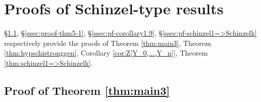 \documentclass[11pt,a4paper,reqno]{amsart}
\theoremstyle{definition}
\begin{document}
\section{Proofs of Schinzel-type results} \label{sec:proofs}

\S \ref{ssec:Schinzel-H}, \S \ref{ssec:proof-thm5-1}, \S \ref{ssec:pf-corollary1.9}, \S \ref{ssec:pf-schinzel1=>Schinzelk} respectively provide the proofs of Theorem \ref{thm:main3}, Theorem \ref{thm:hypschistronggen}, Corollary \ref{cor:Z[Y_0,...,Y_n]}, Theorem \ref{thm:schinzel1=>Schinzelk}.


\subsection{Proof of Theorem \ref{thm:main3}} \label{ssec:Schinzel-H}
\end{document}
